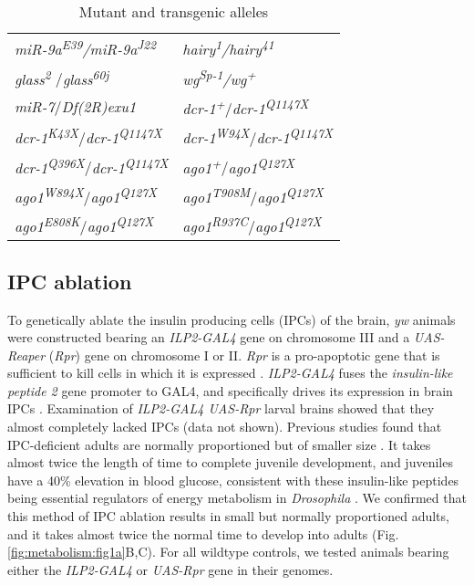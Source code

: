 \begin{table}[h!]
\centering
\caption{Mutant and transgenic alleles}
\label{appendix:metabolism:alleles_table}
\begin{tabular}{L{2in} L{2in}}
\toprule
\textit{miR-9a\textsuperscript{E39}/miR-9a\textsuperscript{J22}} & \textit{hairy\textsuperscript{1}/hairy\textsuperscript{41}} \\
\textit{glass\textsuperscript{2 }}/\textit{glass\textsuperscript{60j}} & \textit{wg\textsuperscript{Sp-1}/wg\textsuperscript{+}} \\
\textit{miR-7\textsuperscript{}}/\textit{Df(2R)exu1} & \textit{dcr-1\textsuperscript{+}}/\textit{dcr-1\textsuperscript{Q1147X}} \\
\textit{dcr-1\textsuperscript{K43X}}/\textit{dcr-1\textsuperscript{Q1147X}} & \textit{dcr-1\textsuperscript{W94X}}/\textit{dcr-1\textsuperscript{Q1147X}} \\
\textit{dcr-1\textsuperscript{Q396X}}/\textit{dcr-1\textsuperscript{Q1147X}} & \textit{ago1\textsuperscript{+}}/\textit{ago1\textsuperscript{Q127X}} \\
\textit{ago1\textsuperscript{W894X}}/\textit{ago1\textsuperscript{Q127X}} & \textit{ago1\textsuperscript{T908M}}/\textit{ago1\textsuperscript{Q127X}} \\
\textit{ago1\textsuperscript{E808K}}/\textit{ago1\textsuperscript{Q127X}} & \textit{ago1\textsuperscript{R937C}}/\textit{ago1\textsuperscript{Q127X}} \\
\bottomrule
\end{tabular}
\end{table}

\subsection{IPC ablation}

To genetically ablate the insulin producing cells (IPCs) of the brain, \textit{yw} animals were constructed bearing an \textit{ILP2-GAL4} gene on chromosome III and a \textit{UAS-Reaper} (\textit{Rpr}) gene on chromosome I or II. \textit{Rpr} is a pro-apoptotic gene that is sufficient to kill cells in which it is expressed \cite{Lohmann2002}. \textit{ILP2-GAL4} fuses the \textit{insulin-like peptide 2} gene promoter to GAL4, and specifically drives its expression in brain IPCs \cite{Rulifson2002}. Examination of \textit{ILP2-GAL4 UAS-Rpr} larval brains showed that they almost completely lacked IPCs (data not shown). Previous studies found that IPC-deficient adults are normally proportioned but of smaller size \cite{Rulifson2002}. It takes almost twice the length of time to complete juvenile development, and juveniles have a 40\% elevation in blood glucose, consistent with these insulin-like peptides being essential regulators of energy metabolism in \textit{Drosophila} \cite{Rulifson2002}. We confirmed that this method of IPC ablation results in small but normally proportioned adults, and it takes almost twice the normal time to develop into adults (Fig. \ref{fig:metabolism:fig1a}B,C). For all wildtype controls, we tested animals bearing either the \textit{ILP2-GAL4} or \textit{UAS-Rpr} gene in their genomes.

